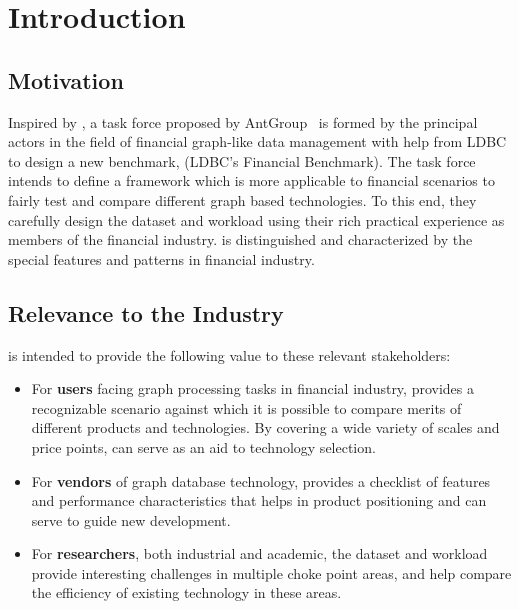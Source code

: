\chapter{Introduction}
\label{sec:introduction}


\section{Motivation}

Inspired by \ldbcsnb, a task force proposed by AntGroup~\cite{antgroup} is
formed by the principal actors in the field of financial graph-like data
management with help from LDBC to design a new benchmark, \ldbcfinbench (LDBC's
Financial Benchmark). The task force intends to define a framework which is more
applicable to financial scenarios to fairly test and compare different graph
based technologies. To this end, they carefully design the dataset and workload
using  their rich practical experience as members of the financial industry. \ldbcfinbench is distinguished and characterized by the special features and
patterns in financial industry.


\section{Relevance to the Industry}

\ldbcfinbench is intended to provide the following value to these relevant
stakeholders:

\begin{itemize}
    \item For \textbf{users} facing graph processing tasks in financial industry,
          \ldbcfinbench provides a recognizable scenario against which it is possible
          to compare merits of different products and technologies. By covering a wide
          variety of scales and price points, \ldbcfinbench can serve as an aid to
          technology selection.
    \item For \textbf{vendors} of graph database technology, \ldbcfinbench provides a
          checklist of features and performance characteristics that helps in product
          positioning and can serve to guide new development.
    \item For \textbf{researchers}, both industrial and academic, the \ldbcfinbench
          dataset and workload provide interesting challenges in multiple choke point
          areas, and help compare the efficiency of existing technology in these
          areas.
\end{itemize}

